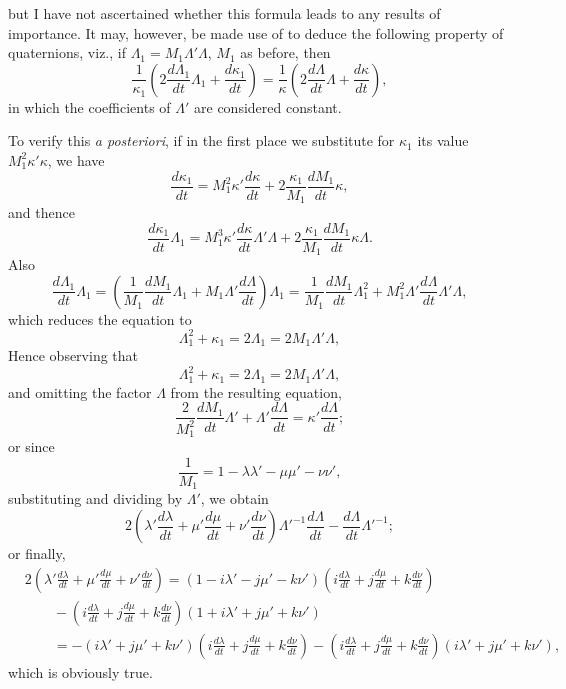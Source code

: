 \documentclass[11pt]{article}
\begin{document}
but I have not ascertained whether this formula leads to any results of importance.
It may, however, be made use of to deduce the following property of quaternions, viz.,
if $\Lambda_{1} = M_{1}\Lambda'\Lambda$, $M_{1}$ as before, then
\[
\frac{1}{\kappa_{1}}\left(2\frac{d\Lambda_{1}}{dt}\Lambda_{1} + \frac{d\kappa_{1}}{dt}\right) = \frac{1}{\kappa}\left(2\frac{d\Lambda}{dt}\Lambda + \frac{d\kappa}{dt}\right),
\]
in which the coefficients of $\Lambda'$ are considered constant.

\medskip

To verify this \textit{a posteriori}, if in the first place we substitute for $\kappa_{1}$ its value
$M_{1}^{2}\kappa'\kappa$, we have
\[
\frac{d\kappa_{1}}{dt} = M_{1}^{2}\kappa'\frac{d\kappa}{dt} + 2\frac{\kappa_{1}}{M_{1}}\frac{dM_{1}}{dt}\kappa,
\]
and thence
\[
\frac{d\kappa_{1}}{dt}\Lambda_{1} = M_{1}^{3}\kappa'\frac{d\kappa}{dt}\Lambda'\Lambda + 2\frac{\kappa_{1}}{M_{1}}\frac{dM_{1}}{dt}\kappa\Lambda.
\]
Also
\[
\frac{d\Lambda_{1}}{dt}\Lambda_{1} = \left(\frac{1}{M_{1}}\frac{dM_{1}}{dt}\Lambda_{1} + M_{1}\Lambda'\frac{d\Lambda}{dt}\right)\Lambda_{1} = \frac{1}{M_{1}}\frac{dM_{1}}{dt}\Lambda_{1}^{2} + M_{1}^{2}\Lambda'\frac{d\Lambda}{dt}\Lambda'\Lambda,
\]
which reduces the equation to
\[
\Lambda_{1}^{2} + \kappa_{1} = 2\Lambda_{1} = 2M_{1}\Lambda'\Lambda,
\]
Hence observing that
\[
\Lambda_{1}^{2} + \kappa_{1} = 2\Lambda_{1} = 2M_{1}\Lambda'\Lambda,
\]
and omitting the factor $\Lambda$ from the resulting equation,
\[
\frac{2}{M_{1}^{2}}\frac{dM_{1}}{dt}\Lambda' + \Lambda'\frac{d\Lambda}{dt} = \kappa'\frac{d\Lambda}{dt};
\]
or since
\[
\frac{1}{M_{1}} = 1 - \lambda\lambda' - \mu\mu' - \nu\nu',
\]
substituting and dividing by $\Lambda'$, we obtain
\[
2\left(\lambda'\frac{d\lambda}{dt} + \mu'\frac{d\mu}{dt} + \nu'\frac{d\nu}{dt}\right)\Lambda'^{-1}\frac{d\Lambda}{dt} - \frac{d\Lambda}{dt}\Lambda'^{-1};
\]
or finally,
\begin{align*}
&2\left(\lambda'\frac{d\lambda}{dt} + \mu'\frac{d\mu}{dt} + \nu'\frac{d\nu}{dt}\right) = (1 - i\lambda' - j\mu' - k\nu')\left(i\frac{d\lambda}{dt} + j\frac{d\mu}{dt} + k\frac{d\nu}{dt}\right)\\
&\qquad - \left(i\frac{d\lambda}{dt} + j\frac{d\mu}{dt} + k\frac{d\nu}{dt}\right)(1 + i\lambda' + j\mu' + k\nu')\\
&\qquad = -(i\lambda' + j\mu' + k\nu')\left(i\frac{d\lambda}{dt} + j\frac{d\mu}{dt} + k\frac{d\nu}{dt}\right) - \left(i\frac{d\lambda}{dt} + j\frac{d\mu}{dt} + k\frac{d\nu}{dt}\right)(i\lambda' + j\mu' + k\nu'),
\end{align*}
which is obviously true.
\end{document}
